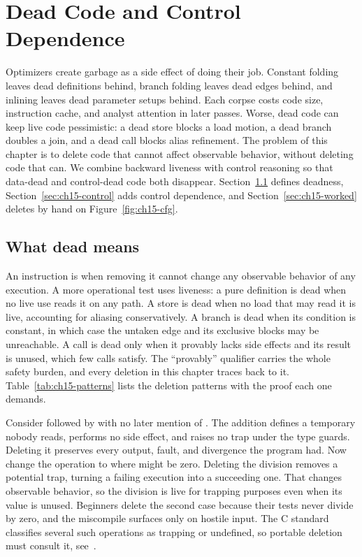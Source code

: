 \chapter{Dead Code and Control Dependence}
\label{ch:ch15-dead-code-control-dependence}

Optimizers create garbage as a side effect of doing their job.
Constant folding leaves dead definitions behind, branch folding leaves dead edges behind, and inlining leaves dead parameter setups behind.
Each corpse costs code size, instruction cache, and analyst attention in later passes.
Worse, dead code can keep live code pessimistic: a dead store blocks a load motion, a dead branch doubles a join, and a dead call blocks alias refinement.
The problem of this chapter is to delete code that cannot affect observable behavior, without deleting code that can.
We combine backward liveness with control reasoning so that data-dead and control-dead code both disappear.
Section~\ref{sec:ch15-dead} defines deadness, Section~\ref{sec:ch15-control} adds control dependence, and Section~\ref{sec:ch15-worked} deletes by hand on Figure~\ref{fig:ch15-cfg}.

\section{What dead means}
\label{sec:ch15-dead}

An instruction is  when removing it cannot change any observable behavior of any execution.
A more operational test uses liveness: a pure definition is dead when no live use reads it on any path.
A store is dead when no load that may read it is live, accounting for aliasing conservatively.
A branch is dead when its condition is constant, in which case the untaken edge and its exclusive blocks may be unreachable.
A call is dead only when it provably lacks side effects and its result is unused, which few calls satisfy.
The \enquote{provably} qualifier carries the whole safety burden, and every deletion in this chapter traces back to it.
Table~\ref{tab:ch15-patterns} lists the deletion patterns with the proof each one demands.

Consider  followed by  with no later mention of .
The addition defines a temporary nobody reads, performs no side effect, and raises no trap under the type guards.
Deleting it preserves every output, fault, and divergence the program had.
Now change the operation to  where  might be zero.
Deleting the division removes a potential trap, turning a failing execution into a succeeding one.
That changes observable behavior, so the division is live for trapping purposes even when its value is unused.
Beginners delete the second case because their tests never divide by zero, and the miscompile surfaces only on hostile input.
The C standard classifies several such operations as trapping or undefined, so portable deletion must consult it, see~\cite{wg14-2011-c11}.

